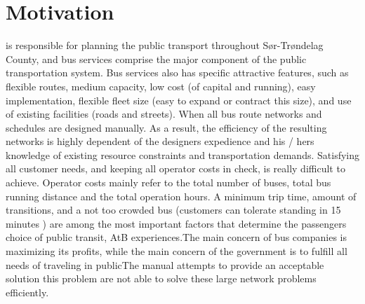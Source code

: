 \section{Motivation}

 \citet{website:atb} is responsible for planning the public transport throughout Sør-Trøndelag County, and bus services comprise the major component of the public transportation system. Bus services also has specific attractive features, such as flexible routes, medium capacity, low cost (of capital and running), easy implementation, flexible fleet size (easy to expand or contract this size), and use of existing facilities (roads and streets). When all bus route networks and schedules are designed manually. As a result, the efficiency of the resulting networks is highly dependent of the designers expedience and his / hers knowledge of existing resource constraints and transportation demands.  Satisfying all customer needs, and keeping all operator costs in check, is really difficult to achieve. Operator costs mainly refer to the total number of buses, total bus running distance and the total operation hours. A minimum trip time, amount of transitions, and a not too crowded bus (customers can tolerate standing in 15 minutes ) are among the most important factors that determine the passengers choice of public transit, AtB experiences.The main concern of bus companies is maximizing its profits, while the main concern of the government is to fulfill all needs of traveling in publicThe manual attempts to provide an acceptable solution this problem are not able to solve these large network problems efficiently.

